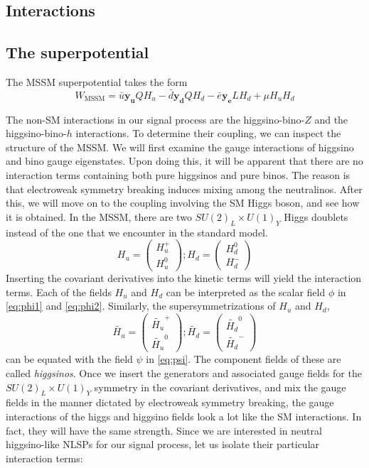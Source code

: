 \subsection{Interactions}
\subsection{The superpotential}
The MSSM superpotential takes the form
\[W_\text{MSSM} = \bar{u}\mathbf{y_u}QH_u-\bar{d}\mathbf{y_d}Q H_d-\bar{e}\mathbf{y_e}L H_d+\mu H_u H_d \]

The non-SM interactions in our signal process are the higgsino-bino-$Z$ and the higgsino-bino-$h$ interactions. To determine their coupling, we can inspect the structure of the MSSM. We will first examine the gauge interactions of higgsino and bino gauge eigenstates. Upon doing this, it will be apparent that there are no interaction terms containing both pure higgsinos and pure binos. The reason is that electroweak symmetry breaking induces mixing among the neutralinos. After this, we will move on to the coupling involving the SM Higgs boson, and see how it is obtained. 
In the MSSM, there are two $SU(2)_L\times U(1)_Y$ Higgs doublets instead of the one that we encounter in the standard model.
\[H_u = \begin{pmatrix}H_u^+\\H_u^0\end{pmatrix};
H_d = \begin{pmatrix}H_d^0\\H_d^-\end{pmatrix}\]
Inserting the covariant derivatives into the kinetic terms will yield the interaction terms. Each of the fields $H_u$ and $H_d$ can be interpreted as the scalar field $\phi$ in \autoref{eq:phi1} and \autoref{eq:phi2}. Similarly, the supersymmetrizations of $H_u$ and $H_d$,
\[\widetilde{H_u} = \begin{pmatrix}\widetilde{H_u}^+\\\widetilde{H_u}^0\end{pmatrix};
\widetilde{H_d} = \begin{pmatrix}\widetilde{H_d}^0\\\widetilde{H_d}^-\end{pmatrix}\]
can be equated with the field $\psi$ in \autoref{eq:psi}. The component fields of these are called \emph{higgsinos}. Once we insert the generators and associated gauge fields for the $SU(2)_L\times U(1)_Y$ symmetry in the covariant derivatives, and mix the gauge fields in the manner dictated by electroweak symmetry breaking, the gauge interactions of the higgs and higgsino fields look a lot like the SM interactions. In fact, they will have the same strength. Since we are interested in neutral higgsino-like NLSPs for our signal process, let us isolate their particular interaction terms:
